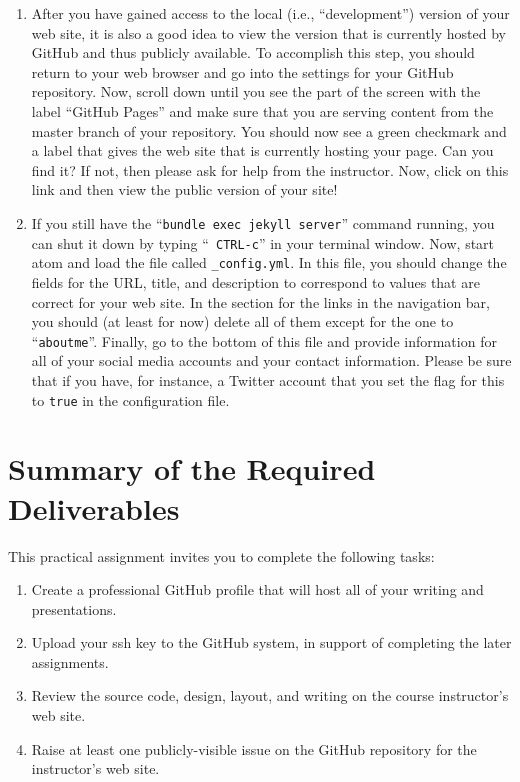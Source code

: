 \begin{enumerate}
  \item After you have gained access to the local (i.e., ``development'') version of your web site, it is also a good
    idea to view the version that is currently hosted by GitHub and thus publicly available. To accomplish this step,
    you should return to your web browser and go into the settings for your GitHub repository. Now, scroll down until
    you see the part of the screen with the label ``GitHub Pages'' and make sure that you are serving content from the
    master branch of your repository. You should now see a green checkmark and a label that gives the web site that is
    currently hosting your page. Can you find it? If not, then please ask for help from the instructor. Now,
    click on this link and then view the public version of your site!

  \item If you still have the ``{\tt bundle exec jekyll server}'' command running, you can shut it down by typing ``{\tt
    CTRL-c}'' in your terminal window. Now, start atom and load the file called {\tt \_config.yml}. In this file, you
    should change the fields for the URL, title, and description to correspond to values that are correct for your web
    site. In the section for the links in the navigation bar, you should (at least for now) delete all of them except
    for the one to ``{\tt aboutme}''. Finally, go to the bottom of this file and provide information for all of your
    social media accounts and your contact information. Please be sure that if you have, for instance, a Twitter account
    that you set the flag for this to {\tt true} in the configuration file.

\end{enumerate}

\vspace*{-.05in}
\section*{Summary of the Required Deliverables}

This practical assignment invites you to complete the following tasks:

\vspace*{-.1in}
\begin{enumerate}
  \setlength{\itemsep}{0in}

  \item Create a professional GitHub profile that will host all of your writing and presentations.
  \item Upload your ssh key to the GitHub system, in support of completing the later assignments.
  \item Review the source code, design, layout, and writing on the course instructor's web site.
  \item Raise at least one publicly-visible issue on the GitHub repository for the instructor's web site.

\end{enumerate}
\vspace*{-.1in}

